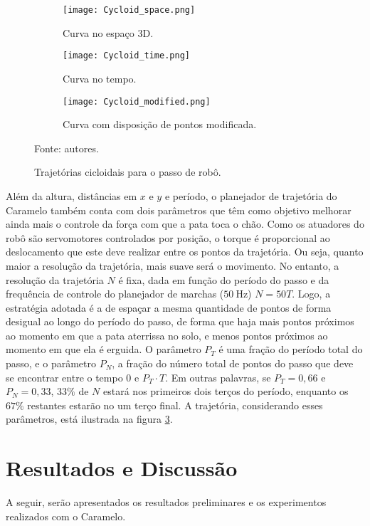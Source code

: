 \documentclass[conference]{IEEEtran}
\begin{document}
\begin{figure*}[h]
    \centering
    \begin{subfigure}[t]{0.32\textwidth}
      \centering
      \texttt{[image: Cycloid\_space.png]}
      \caption{Curva no espaço 3D.}
      \label{fig:traj_space}
    \end{subfigure}
    \begin{subfigure}[t]{0.32\textwidth}
      \centering
      \texttt{[image: Cycloid\_time.png]}
      \caption{Curva no tempo.}
      \label{fig:traj_time}
    \end{subfigure}
    \begin{subfigure}[t]{0.32\textwidth}
      \centering
      \texttt{[image: Cycloid\_modified.png]}
      \caption{Curva com disposição de pontos modificada.}
      \label{fig:traj_time_modified}
    \end{subfigure}
    \vfill
    \caption{Trajetórias cicloidais para o passo de robô.}
    Fonte: autores.
    \label{fig:traj_curve}
\end{figure*}

Além da altura, distâncias em $x$ e $y$ e período, o planejador de trajetória do Caramelo também conta com dois parâmetros que têm como objetivo melhorar ainda mais o controle da força com que a pata toca o chão. Como os atuadores do robô são servomotores controlados por posição, o torque é proporcional ao deslocamento que este deve realizar entre os pontos da trajetória. Ou seja, quanto maior a resolução da trajetória, mais suave será o movimento. No entanto, a resolução da trajetória $N$ é fixa, dada em função do período do passo e da frequência de controle do planejador de marchas ($\SI{50}{\hertz}$) $N = 50T$. Logo, a estratégia adotada é a de espaçar a mesma quantidade de pontos de forma desigual ao longo do período do passo, de forma que haja mais pontos próximos ao momento em que a pata aterrissa no solo, e menos pontos próximos ao momento em que ela é erguida. O parâmetro $P_T$ é uma fração do período total do passo, e o parâmetro $P_N$, a fração do número total de pontos do passo que deve se encontrar entre o tempo $0$ e $P_T \cdot T$. Em outras palavras, se $P_T = 0,66$ e $P_N = 0,33$, $33\%$ de $N$ estará nos primeiros dois terços do período, enquanto os $67\%$ restantes estarão no um terço final. A trajetória, considerando esses parâmetros, está ilustrada na figura \ref{fig:traj_time_modified}.

\section{Resultados e Discussão}
A seguir, serão apresentados os resultados preliminares e os experimentos realizados com o Caramelo. 
  
\end{document}
